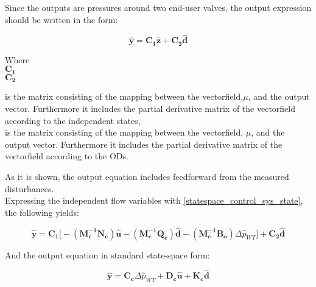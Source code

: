 Since the outputs are pressures around two end-user valves, the output expression should be written in the form:

\begin{equation}
  \pmb{\hat{y}} = \pmb{C_1} \pmb{\hat{z}} + \pmb{C_2} \pmb{\hat{d}}  
   \label{statespace_control_output}
\end{equation}

\begin{minipage}[t]{0.20\textwidth}
Where\\
\hspace*{8mm} $\pmb{C_1}$ \\
\newline
\newline
\newline
\hspace*{8mm} $\pmb{C_2}$ 
\end{minipage}
\begin{minipage}[t]{0.68\textwidth}
\vspace*{2mm}
is the matrix consisting of the mapping between the vectorfield,$\mu$, and the output vector. Furthermore it includes the partial derivative matrix of the vectorfield according to the independent states, \\
is the matrix consisting of the mapping between the vectorfield, $\mu$, and the output vector. Furthermore it includes the partial derivative matrix of the vectorfield according to the ODs.
\end{minipage}

As it is shown, the output equation includes feedforward from the measured disturbances. 
\\
Expressing the independent flow variables with \eqref{statespace_control_sys_state}, the following yields: 

\begin{equation}
  \pmb{\hat{y}} = \pmb{C_1} \big[- (\pmb{M_c^{-1}}\pmb{N_c}) \pmb{\hat{u}} - (\pmb{M_c^{-1}}\pmb{Q_c}) \pmb{\hat{d}} - (\pmb{M_c^{-1}}\pmb{B_o}) \Delta \hat{p}_{WT}\big] + \pmb{C_2} \pmb{\hat{d}}  
   \label{statespace_control_output}
\end{equation}

And the output equation in standard state-space form:

\begin{equation}
  \pmb{\hat{y}} = \pmb{C_c} \Delta \hat{p}_{WT} + \pmb{D_c} \pmb{\hat{u}} + \pmb{K_c} \pmb{\hat{d}}
\label{statespace_control_output_standard}
\end{equation}

